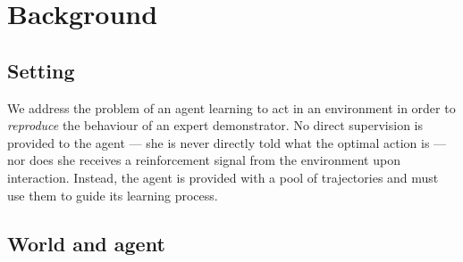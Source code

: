 \section{Background}

\subsection*{Setting}

We address the problem of an agent learning to act in an environment in order
to \emph{reproduce} the behaviour of an expert demonstrator.
No direct supervision is provided to the agent --- she is never directly told
what the optimal action is --- nor does she receives a reinforcement signal
from the environment upon interaction.
Instead, the agent is provided with a pool of trajectories and must use them to
guide its learning process.

\subsection*{World and agent}

